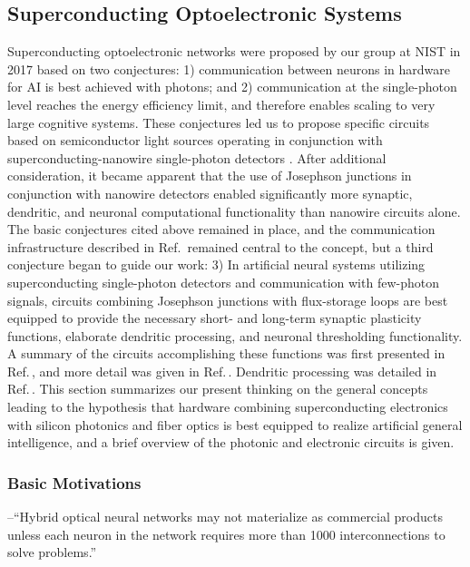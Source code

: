 \subsection{\label{sec:superconducting_optoelectronic}Superconducting Optoelectronic Systems}
Superconducting optoelectronic networks were proposed by our group at NIST in 2017 based on two conjectures: 1) communication between neurons in hardware for AI is best achieved with photons; and 2) communication at the single-photon level reaches the energy efficiency limit, and therefore enables scaling to very large cognitive systems. These conjectures led us to propose specific circuits based on semiconductor light sources operating in conjunction with superconducting-nanowire single-photon detectors \cite{shbu2017}. After additional consideration, it became apparent that the use of Josephson junctions in conjunction with nanowire detectors enabled significantly more synaptic, dendritic, and neuronal computational functionality than nanowire circuits alone. The basic conjectures cited above remained in place, and the communication infrastructure described in Ref.\, remained central to the concept, but a third conjecture began to guide our work: 3) In artificial neural systems utilizing superconducting single-photon detectors and communication with few-photon signals, circuits combining Josephson junctions with flux-storage loops are best equipped to provide the necessary short- and long-term synaptic plasticity functions, elaborate dendritic processing, and neuronal thresholding functionality. A summary of the circuits accomplishing these functions was first presented in Ref.\,, and more detail was given in Ref.\,. Dendritic processing was detailed in Ref.\,. This section summarizes our present thinking on the general concepts leading to the hypothesis that hardware combining superconducting electronics with silicon photonics and fiber optics is best equipped to realize artificial general intelligence, and a brief overview of the photonic and electronic circuits is given.

\subsubsection{Basic Motivations}
--``Hybrid optical neural networks may not materialize as commercial products unless each neuron in the network requires more than 1000 interconnections to solve problems.'' \cite{juya1996}

